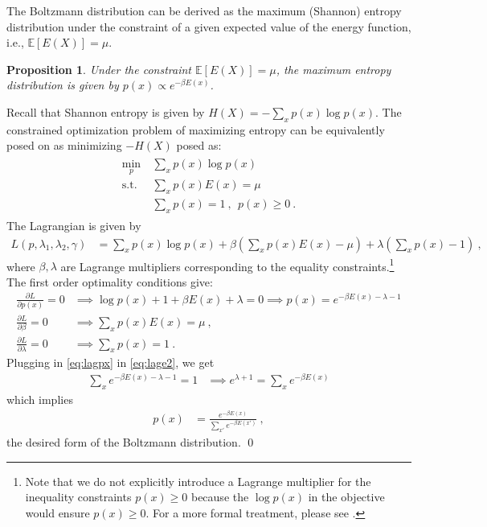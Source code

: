 \documentclass{article}
\newtheorem{prop}{Proposition}
\newcommand\E{\mathbb{E}}
\begin{document}
The Boltzmann distribution can be derived as the maximum (Shannon) entropy distribution under the constraint of a given expected value of the energy function, i.e., $\E[E(X)] = \mu$. 
\begin{prop}
	Under the constraint $\E[E(X)] = \mu$, the maximum entropy distribution is given by $p(x) \propto e^{-\beta E(x)}$.
\end{prop}
\proof Recall that Shannon entropy is given by $H(X) = - \sum_x p(x) \log p(x)$. The constrained optimization problem of maximizing entropy can be equivalently posed on as minimizing $-H(X)$ posed as:
\begin{align}
	\begin{split}
		\min_{p}~ & \sum_x p(x) \log p(x) \\
		\text{s.t.}~& \sum_x p(x) E(x) = \mu \\
		& \sum_{x} p(x) = 1~, ~~p(x) \geq 0~.
	\end{split}
\end{align}
The Lagrangian is given by
\begin{align*}
	L(p,\lambda_1, \lambda_2,\gamma) & = \sum_x p(x) \log p(x) + \beta \left(\sum_x p(x) E(x) - \mu \right) + \lambda \left(\sum_x p(x) -1 \right)~,
\end{align*}
where $\beta, \lambda$ are Lagrange multipliers corresponding to the equality constraints.\footnote{Note that we do not explicitly introduce a Lagrange multiplier for the inequality constraints $p(x) \geq 0$ because the $\log p(x)$ in the objective would ensure $p(x) \geq 0$. For a more formal treatment, please see .} The first order optimality conditions give:
\begin{align}
	\frac{\partial L}{\partial p(x)} = 0 & \implies \log p(x) + 1 + \beta E(x) + \lambda = 0  \implies p(x) = e^{-\beta E(x) - \lambda - 1} \label{eq:lagpx} \\
	\frac{\partial L}{\partial \beta} = 0 & \implies \sum_x p(x) E(x) = \mu~, \label{eq:lage1}\\
	\frac{\partial L}{\partial \lambda} = 0 & \implies  \sum_x p(x) = 1~.\label{eq:lage2}
\end{align}
Plugging in \eqref{eq:lagpx} in \eqref{eq:lage2}, we get
\begin{align*}
	\sum_x e^{-\beta E(x) - \lambda - 1}  = 1 & \implies e^{\lambda + 1} = \sum_x e^{-\beta E(x)}
\end{align*}
which implies
\begin{align*}
	p(x) & = \frac{e^{-\beta E(x)}}{\sum_{x'} e^{-\beta E(x')}}~,
\end{align*}
the desired form of the Boltzmann distribution.  \qed 
\end{document}
